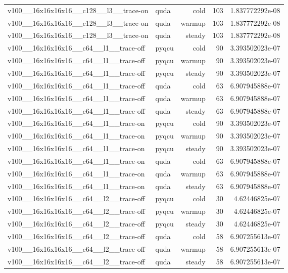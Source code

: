 \begin{table}[htbp]
\begin{tabular}{@{}llrrr@{}}
v100\_\_16x16x16x16\_\_c128\_\_l3\_\_trace-on & quda & cold & 103 & 1.837772292e-08 \\
v100\_\_16x16x16x16\_\_c128\_\_l3\_\_trace-on & quda & warmup & 103 & 1.837772292e-08 \\
v100\_\_16x16x16x16\_\_c128\_\_l3\_\_trace-on & quda & steady & 103 & 1.837772292e-08 \\
v100\_\_16x16x16x16\_\_c64\_\_l1\_\_trace-off & pyqcu & cold & 90 & 3.393502023e-07 \\
v100\_\_16x16x16x16\_\_c64\_\_l1\_\_trace-off & pyqcu & warmup & 90 & 3.393502023e-07 \\
v100\_\_16x16x16x16\_\_c64\_\_l1\_\_trace-off & pyqcu & steady & 90 & 3.393502023e-07 \\
v100\_\_16x16x16x16\_\_c64\_\_l1\_\_trace-off & quda & cold & 63 & 6.907945888e-07 \\
v100\_\_16x16x16x16\_\_c64\_\_l1\_\_trace-off & quda & warmup & 63 & 6.907945888e-07 \\
v100\_\_16x16x16x16\_\_c64\_\_l1\_\_trace-off & quda & steady & 63 & 6.907945888e-07 \\
v100\_\_16x16x16x16\_\_c64\_\_l1\_\_trace-on & pyqcu & cold & 90 & 3.393502023e-07 \\
v100\_\_16x16x16x16\_\_c64\_\_l1\_\_trace-on & pyqcu & warmup & 90 & 3.393502023e-07 \\
v100\_\_16x16x16x16\_\_c64\_\_l1\_\_trace-on & pyqcu & steady & 90 & 3.393502023e-07 \\
v100\_\_16x16x16x16\_\_c64\_\_l1\_\_trace-on & quda & cold & 63 & 6.907945888e-07 \\
v100\_\_16x16x16x16\_\_c64\_\_l1\_\_trace-on & quda & warmup & 63 & 6.907945888e-07 \\
v100\_\_16x16x16x16\_\_c64\_\_l1\_\_trace-on & quda & steady & 63 & 6.907945888e-07 \\
v100\_\_16x16x16x16\_\_c64\_\_l2\_\_trace-off & pyqcu & cold & 30 & 4.62446825e-07 \\
v100\_\_16x16x16x16\_\_c64\_\_l2\_\_trace-off & pyqcu & warmup & 30 & 4.62446825e-07 \\
v100\_\_16x16x16x16\_\_c64\_\_l2\_\_trace-off & pyqcu & steady & 30 & 4.62446825e-07 \\
v100\_\_16x16x16x16\_\_c64\_\_l2\_\_trace-off & quda & cold & 58 & 6.907255613e-07 \\
v100\_\_16x16x16x16\_\_c64\_\_l2\_\_trace-off & quda & warmup & 58 & 6.907255613e-07 \\
v100\_\_16x16x16x16\_\_c64\_\_l2\_\_trace-off & quda & steady & 58 & 6.907255613e-07 \\

\end{tabular}
\end{table}
